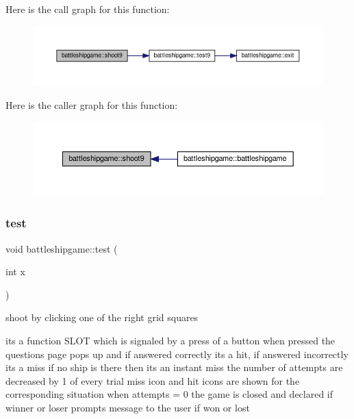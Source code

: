 Here is the call graph for this function\+:
\nopagebreak
\begin{figure}[H]
\begin{center}
\leavevmode
\includegraphics[width=350pt]{classbattleshipgame_adf78a189286f1bce1f6c291b4b7c72b4_cgraph}
\end{center}
\end{figure}
Here is the caller graph for this function\+:
\nopagebreak
\begin{figure}[H]
\begin{center}
\leavevmode
\includegraphics[width=350pt]{classbattleshipgame_adf78a189286f1bce1f6c291b4b7c72b4_icgraph}
\end{center}
\end{figure}
\mbox{\label{classbattleshipgame_a2bc96daab5fee23ae0a5718416d52bec}} 
\subsubsection{\texorpdfstring{test}{test}}
{\footnotesize\ttfamily void battleshipgame\+::test (\begin{DoxyParamCaption}\item[{int}]{x }\end{DoxyParamCaption})\hspace{0.3cm}{\ttfamily [slot]}}



shoot by clicking one of the right grid squares 

its a function S\+L\+OT which is signaled by a press of a button when pressed the questions page pops up and if answered correctly its a hit, if answered incorrectly its a miss if no ship is there then its an instant miss the number of attempts are decreased by 1 of every trial miss icon and hit icons are shown for the corresponding situation when attempts = 0 the game is closed and declared if winner or loser prompts message to the user if won or lost

